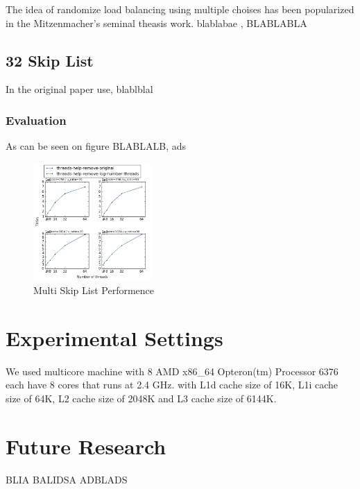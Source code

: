 \documentclass{article}
\begin{document}
The idea of randomize load balancing using multiple choises has been popularized in the Mitzenmacher's seminal theasis work\cite{C5}. blablabae , BLABLABLA

\subsection{32 Skip List}
\label{ssec:dsrs}

In the original paper use, blablblal

\subsubsection{Evaluation}
\label{sssec:dsrs-evl}

As can be seen on figure BLABLALB, ads

\begin{figure}
	\caption{Multi Skip List Performence}
	\centering
	\includegraphics[width=0.4\textwidth]{many_skiplists_plot}
\end{figure}

\section{Experimental Settings}
\label{sec:exp}

We used multicore machine with 8 AMD x86\_64 Opteron(tm) Processor 6376 each have 8 cores that runs at 2.4 GHz. with L1d cache size of 16K, L1i cache size of 64K, L2 cache size of 2048K and L3 cache size of 6144K.

\section{Future Research}
\label{sec:foot}

BLIA BALIDSA ADBLADS






\end{document}

